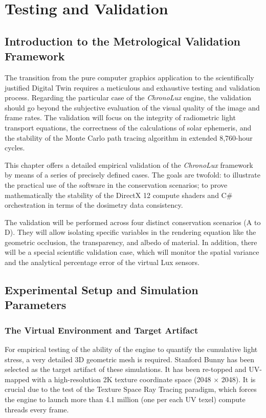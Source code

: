 \chapter{Testing and Validation}
\pagestyle{fancy}

\section{Introduction to the Metrological Validation Framework}

The transition from the pure computer graphics application to the scientifically justified Digital Twin requires a meticulous and exhaustive testing and validation process. Regarding the particular case of the \textit{ChronoLux} engine, the validation should go beyond the subjective evaluation of the visual quality of the image and frame rates. The validation will focus on the integrity of radiometric light transport equations, the correctness of the calculations of solar ephemeris, and the stability of the Monte Carlo path tracing algorithm in extended 8,760-hour cycles.

This chapter offers a detailed empirical validation of the \textit{ChronoLux} framework by means of a series of precisely defined cases. The goals are twofold: to illustrate the practical use of the software in the conservation scenarios; to prove mathematically the stability of the DirectX 12 compute shaders and C\# orchestration in terms of the dosimetry data consistency.

The validation will be performed across four distinct conservation scenarios (A to D). They will allow isolating specific variables in the rendering equation like the geometric occlusion, the transparency, and albedo of material. In addition, there will be a special scientific validation case, which will monitor the spatial variance and the analytical percentage error of the virtual Lux sensors.

\section{Experimental Setup and Simulation Parameters}

\subsection{The Virtual Environment and Target Artifact}

For empirical testing of the ability of the engine to quantify the cumulative light stress, a very detailed 3D geometric mesh is required. Stanford Bunny has been selected as the target artifact of these simulations. It has been re-topped and UV-mapped with a high-resolution 2K texture coordinate space (2048 $\times$ 2048). It is crucial due to the test of the Texture Space Ray Tracing paradigm, which forces the engine to launch more than 4.1 million (one per each UV texel) compute threads every frame.

